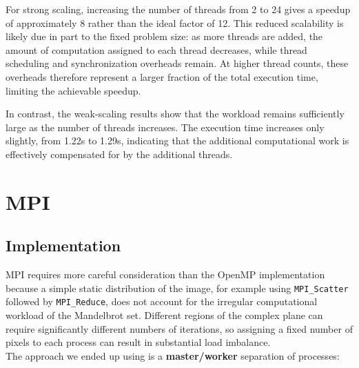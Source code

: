 \documentclass[a4paper]{article}
\begin{document}
For strong scaling, increasing the number of threads from 2 to 24 gives a speedup of approximately 8 rather than the ideal factor of 12. This reduced scalability is likely due in part to the fixed problem size: as more threads are added, the amount of computation assigned to each thread decreases, while thread scheduling and synchronization overheads remain. At higher thread counts, these overheads therefore represent a larger fraction of the total execution time, limiting the achievable speedup.

In contrast, the weak-scaling results show that the workload remains sufficiently large as the number of threads increases. The execution time increases only slightly, from 1.22s to 1.29s, indicating that the additional computational work is effectively compensated for by the additional threads.

\newpage

\section{MPI}
\subsection{Implementation}
MPI requires more careful consideration than the OpenMP implementation because a simple static distribution of the image, for example using \texttt{MPI\_Scatter} followed by \texttt{MPI\_Reduce}, does not account for the irregular computational workload of the Mandelbrot set. Different regions of the complex plane can require significantly different numbers of iterations, so assigning a fixed number of pixels to each process can result in substantial load imbalance.\\

The approach we ended up using is a \textbf{master/worker} separation of processes:
\end{document}
